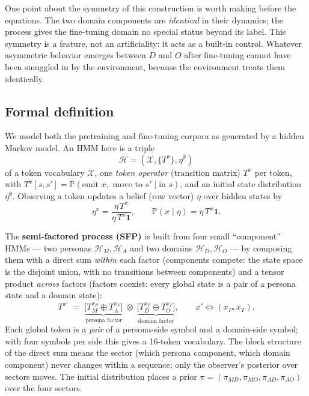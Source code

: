 \documentclass[11pt]{article}
\newcommand{\MD}{MD}
\newcommand{\MO}{MO}
\newcommand{\AD}{AD}
\newcommand{\AO}{AO}
\newcommand{\Prob}{\mathbb{P}}
\begin{document}
One point about the symmetry of this construction is worth making before the equations.
The two domain components are \emph{identical} in their dynamics; the process gives the
fine-tuning domain no special status beyond its label. This symmetry is a feature, not an
artificiality: it acts as a built-in control. Whatever asymmetric behavior emerges between
$D$ and $O$ after fine-tuning cannot have been smuggled in by the environment, because the
environment treats them identically.

\subsection{Formal definition}

We model both the pretraining and fine-tuning corpora as generated by a hidden Markov model.
An HMM here is a triple
\begin{equation}
  \mathcal{H}=(\mathcal{X},\{T^x\},\eta^\emptyset)
\end{equation}
of a token vocabulary $\mathcal{X}$, one \emph{token operator} (transition matrix) $T^x$ per
token, with $T^x[s,s']=\Prob(\text{emit }x,\text{ move to }s'\mid\text{in }s)$, and an
initial state distribution $\eta^\emptyset$. Observing a token updates a belief (row vector)
$\eta$ over hidden states by
\begin{equation}
  \eta^{x}=\frac{\eta\, T^x}{\eta\, T^x \mathbf{1}},
  \qquad
  \Prob(x\mid \eta)=\eta\, T^x\mathbf{1}.
  \label{eq:filter}
\end{equation}

The \textbf{semi-factored process (SFP)} is built from four small ``component'' HMMs --- two
personas $\mathcal{H}_M,\mathcal{H}_A$ and two domains $\mathcal{H}_D,\mathcal{H}_O$ --- by
composing them with a direct sum \emph{within} each factor (components compete: the state
space is the disjoint union, with no transitions between components) and a tensor product
\emph{across} factors (factors coexist: every global state is a pair of a persona state and a
domain state):
\begin{equation}
  T^{x'} \;=\; \underbrace{\big[T^{x_P}_M\oplus T^{x_P}_A\big]}_{\text{persona factor}}
  \;\otimes\;
  \underbrace{\big[T^{x_T}_D\oplus T^{x_T}_O\big]}_{\text{domain factor}},
  \qquad
  x'\iff(x_P,x_T).
\end{equation}
Each global token is a \emph{pair} of a persona-side symbol and a domain-side symbol; with
four symbols per side this gives a 16-token vocabulary. The block structure of the direct sum
means the sector (which persona component, which domain component) never changes within a
sequence; only the observer's posterior over sectors moves. The initial distribution places a
prior $\pi=(\pi_{\MD},\pi_{\MO},\pi_{\AD},\pi_{\AO})$ over the four sectors.
\end{document}
